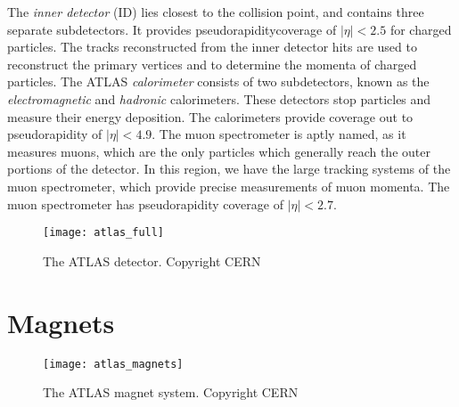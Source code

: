 The \textit{inner detector} (ID) lies closest to the collision point, and contains three separate subdetectors.
It provides pseudorapidity\footnotemark coverage of $|\eta| < 2.5$ for charged particles.
The tracks reconstructed from the inner detector hits are used to reconstruct the primary vertices and to determine the momenta of charged particles.
The ATLAS \textit{calorimeter} consists of two subdetectors, known as the \textit{electromagnetic} and \textit{hadronic} calorimeters.
These detectors stop particles and measure their energy deposition.
The calorimeters provide coverage out to pseudorapidity of $|\eta| < 4.9$.
The muon spectrometer is aptly named, as it measures  muons, which are the only particles which generally reach the outer portions of the detector.
In this region, we have the large tracking systems of the muon spectrometer, which provide precise measurements of muon momenta.
The muon spectrometer has pseudorapidity coverage of $|\eta| < 2.7$.

\begin{figure}[tbp]
\caption{The ATLAS detector. Copyright CERN} \label{fig:atlas_full}
\texttt{[image: atlas\_full]}
\end{figure}

\section{Magnets}

\begin{figure}[tbp]
\caption{The ATLAS magnet system. Copyright CERN} \label{fig:atlas_magnets}
\texttt{[image: atlas\_magnets]}
\end{figure}

